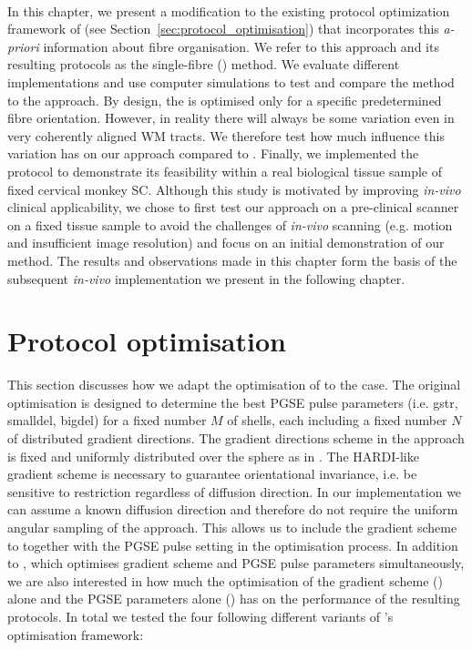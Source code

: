 \paragraph{}
In this chapter, we present a modification to the existing protocol optimization framework of \cite{Alexander:2008} (see Section~\ref{sec:protocol_optimisation}) that incorporates this \textit{a-priori} information about fibre organisation. We refer to this approach and its resulting protocols as the single-fibre ({\SF}) method. We evaluate different {\SF} implementations and use computer simulations to test and compare the \SF method to the {\OI} approach. By design, the {\SF} is optimised only for a specific predetermined fibre orientation. However, in reality there will always be some variation even in very coherently aligned \gls{WM} tracts. We therefore test how much influence this variation has on our {\SF} approach compared to {\OI}. Finally, we implemented the {\SF} protocol to demonstrate its feasibility within a real biological tissue sample of fixed cervical monkey \gls{SC}. Although this study is motivated by improving \emph{in-vivo} clinical applicability, we chose to first test our approach on a pre-clinical scanner on a fixed tissue sample to avoid the challenges of \emph{in-vivo} scanning (e.g. motion and insufficient image resolution) and focus on an initial demonstration of our method. The results and observations made in this chapter form the basis of the subsequent \emph{in-vivo} implementation we present in the following chapter.

\section{Protocol optimisation}
\label{sec:chapter 7 four SF optimisations}
This section discusses how we adapt the {\OI} optimisation of \citet{Alexander:2008} to the {\SF} case. The original {\OI} optimisation is designed to determine the best PGSE pulse parameters (i.e. \gls{gstr}, \gls{smalldel}, \gls{bigdel}) for a fixed number $M$ of shells, each including a fixed number $N$ of distributed gradient directions. The gradient directions scheme in the \OI{} approach is fixed and uniformly distributed over the sphere as in \citep{Cook:2007}. The HARDI-like gradient scheme is necessary to guarantee orientational invariance, i.e. be sensitive to restriction regardless of diffusion direction. In our {\SF} implementation we can assume a known diffusion direction and therefore do not require the uniform angular sampling of the {\OI} approach. This allows us to include the gradient scheme to together with the PGSE pulse setting in the optimisation process. In addition to {\SF}, which optimises gradient scheme and PGSE pulse parameters simultaneously, we are also interested in how much the optimisation of the gradient scheme ({\DO}) alone and the PGSE parameters alone ({\SD}) has on the performance of the resulting protocols. In total we tested the four following different variants of \citet{Alexander:2008}'s optimisation framework:

